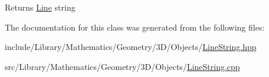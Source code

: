 \begin{DoxyReturn}{Returns}
\hyperlink{classlibrary_1_1math_1_1geom_1_1d3_1_1objects_1_1_line}{Line} string 
\end{DoxyReturn}


The documentation for this class was generated from the following files\+:\begin{DoxyCompactItemize}
\item 
include/\+Library/\+Mathematics/\+Geometry/3\+D/\+Objects/\hyperlink{3_d_2_objects_2_line_string_8hpp}{Line\+String.\+hpp}\item 
src/\+Library/\+Mathematics/\+Geometry/3\+D/\+Objects/\hyperlink{3_d_2_objects_2_line_string_8cpp}{Line\+String.\+cpp}\end{DoxyCompactItemize}
